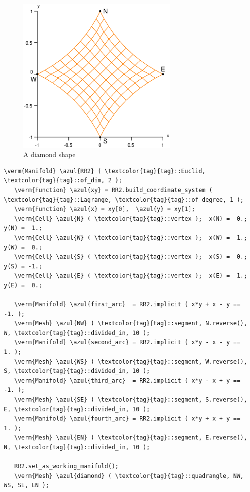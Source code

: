 \begin{figure}[ht] \centering
  \includegraphics[width=80mm]{diamond}
  \caption{A diamond shape}
  \label{\numb section 2.\numb fig 10}
\end{figure}

\begin{Verbatim}[commandchars=\\\{\},formatcom=\small\tt,frame=single,
   label=parag-\ref{\numb section 2.\numb parag 10}.cpp,rulecolor=\color{coment},
   baselinestretch=0.94,framesep=2mm]
   \verm{Manifold} \azul{RR2} ( \textcolor{tag}{tag}::Euclid, \textcolor{tag}{tag}::of_dim, 2 );
   \verm{Function} \azul{xy} = RR2.build_coordinate_system ( \textcolor{tag}{tag}::Lagrange, \textcolor{tag}{tag}::of_degree, 1 );
   \verm{Function} \azul{x} = xy[0],  \azul{y} = xy[1];
   \verm{Cell} \azul{N} ( \textcolor{tag}{tag}::vertex );  x(N) =  0.;   y(N) =  1.;
   \verm{Cell} \azul{W} ( \textcolor{tag}{tag}::vertex );  x(W) = -1.;   y(W) =  0.;
   \verm{Cell} \azul{S} ( \textcolor{tag}{tag}::vertex );  x(S) =  0.;   y(S) = -1.;
   \verm{Cell} \azul{E} ( \textcolor{tag}{tag}::vertex );  x(E) =  1.;   y(E) =  0.;

   \verm{Manifold} \azul{first_arc}  = RR2.implicit ( x*y + x - y == -1. );
   \verm{Mesh} \azul{NW} ( \textcolor{tag}{tag}::segment, N.reverse(), W, \textcolor{tag}{tag}::divided_in, 10 );
   \verm{Manifold} \azul{second_arc} = RR2.implicit ( x*y - x - y ==  1. );
   \verm{Mesh} \azul{WS} ( \textcolor{tag}{tag}::segment, W.reverse(), S, \textcolor{tag}{tag}::divided_in, 10 );
   \verm{Manifold} \azul{third_arc}  = RR2.implicit ( x*y - x + y == -1. );
   \verm{Mesh} \azul{SE} ( \textcolor{tag}{tag}::segment, S.reverse(), E, \textcolor{tag}{tag}::divided_in, 10 );
   \verm{Manifold} \azul{fourth_arc} = RR2.implicit ( x*y + x + y ==  1. );
   \verm{Mesh} \azul{EN} ( \textcolor{tag}{tag}::segment, E.reverse(), N, \textcolor{tag}{tag}::divided_in, 10 );
   
   RR2.set_as_working_manifold();
   \verm{Mesh} \azul{diamond} ( \textcolor{tag}{tag}::quadrangle, NW, WS, SE, EN );
\end{Verbatim}

